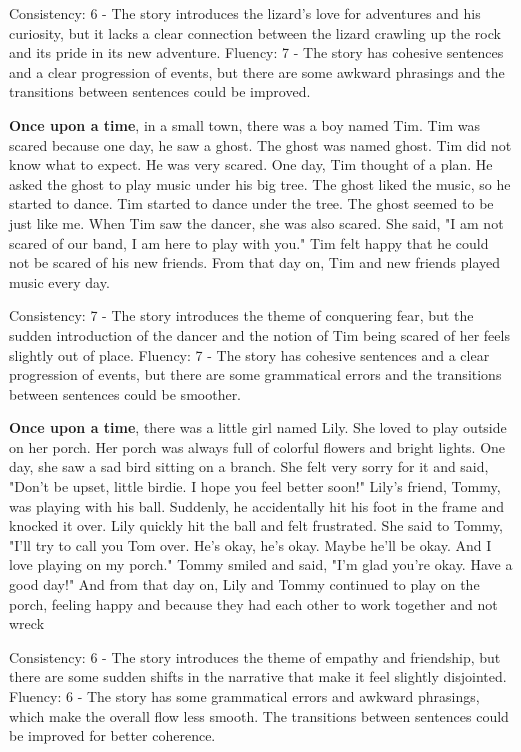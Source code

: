 \documentclass{article}
\begin{document}
Consistency: 6 - The story introduces the lizard's love for adventures and his curiosity, but it lacks a clear connection between the lizard crawling up the rock and its pride in its new adventure.
Fluency: 7 - The story has cohesive sentences and a clear progression of events, but there are some awkward phrasings and the transitions between sentences could be improved.

\textbf{Once upon a time}, in a small town, there was a boy named Tim. Tim was scared because one day, he saw a ghost. The ghost was named ghost. Tim did not know what to expect. He was very scared. One day, Tim thought of a plan. He asked the ghost to play music under his big tree. The ghost liked the music, so he started to dance. Tim started to dance under the tree. The ghost seemed to be just like me. When Tim saw the dancer, she was also scared. She said, "I am not scared of our band, I am here to play with you." Tim felt happy that he could not be scared of his new friends. From that day on, Tim and new friends played music every day.

Consistency: 7 - The story introduces the theme of conquering fear, but the sudden introduction of the dancer and the notion of Tim being scared of her feels slightly out of place.
Fluency: 7 - The story has cohesive sentences and a clear progression of events, but there are some grammatical errors and the transitions between sentences could be smoother.

\textbf{Once upon a time}, there was a little girl named Lily. She loved to play outside on her porch. Her porch was always full of colorful flowers and bright lights. One day, she saw a sad bird sitting on a branch. She felt very sorry for it and said, "Don't be upset, little birdie. I hope you feel better soon!" Lily's friend, Tommy, was playing with his ball. Suddenly, he accidentally hit his foot in the frame and knocked it over. Lily quickly hit the ball and felt frustrated. She said to Tommy, "I'll try to call you Tom over. He's okay, he's okay. Maybe he'll be okay. And I love playing on my porch." Tommy smiled and said, "I'm glad you're okay. Have a good day!" And from that day on, Lily and Tommy continued to play on the porch, feeling happy and because they had each other to work together and not wreck

Consistency: 6 - The story introduces the theme of empathy and friendship, but there are some sudden shifts in the narrative that make it feel slightly disjointed.
Fluency: 6 - The story has some grammatical errors and awkward phrasings, which make the overall flow less smooth. The transitions between sentences could be improved for better coherence.
\end{document}
